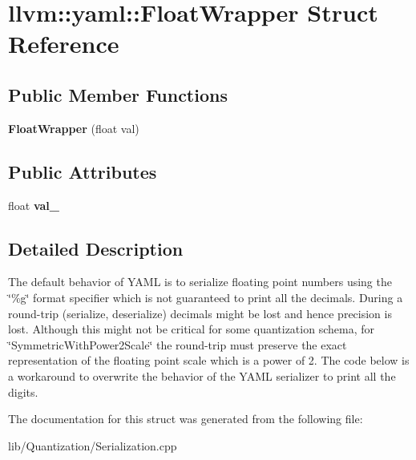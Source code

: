 \hypertarget{structllvm_1_1yaml_1_1_float_wrapper}{}\section{llvm\+:\+:yaml\+:\+:Float\+Wrapper Struct Reference}
\label{structllvm_1_1yaml_1_1_float_wrapper}
\subsection*{Public Member Functions}
\begin{DoxyCompactItemize}
\item 
\mbox{\label{structllvm_1_1yaml_1_1_float_wrapper_a247a2362b92f1fc11da5d21c4d291abb}} 
{\bfseries Float\+Wrapper} (float val)
\end{DoxyCompactItemize}
\subsection*{Public Attributes}
\begin{DoxyCompactItemize}
\item 
\mbox{\label{structllvm_1_1yaml_1_1_float_wrapper_a09988b1775c619f1cdb90139b760f8c2}} 
float {\bfseries val\+\_\+}
\end{DoxyCompactItemize}


\subsection{Detailed Description}
The default behavior of Y\+A\+ML is to serialize floating point numbers using the \char`\"{}\%g\char`\"{} format specifier which is not guaranteed to print all the decimals. During a round-\/trip (serialize, deserialize) decimals might be lost and hence precision is lost. Although this might not be critical for some quantization schema, for \char`\"{}\+Symmetric\+With\+Power2\+Scale\char`\"{} the round-\/trip must preserve the exact representation of the floating point scale which is a power of 2. The code below is a workaround to overwrite the behavior of the Y\+A\+ML serializer to print all the digits. 

The documentation for this struct was generated from the following file\+:\begin{DoxyCompactItemize}
\item 
lib/\+Quantization/Serialization.\+cpp\end{DoxyCompactItemize}
